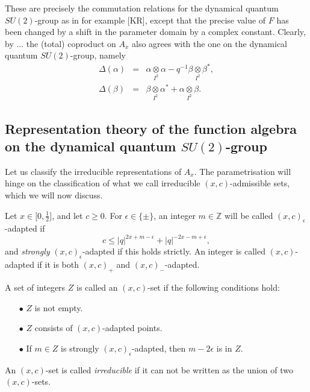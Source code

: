 \documentclass[12pt]{article}
\theoremstyle{change}
\newcommand{\Z}{\mathbb{Z}}
\newcommand{\itimes}{\underset{I^2}{\otimes}}
\theoremstyle{definition}
\numberwithin{equation}{section}
\begin{document}
These are precisely the commutation relations for the dynamical quantum $SU(2)$-group as in for example [KR], except that the precise value of $F$ has been changed by a shift in the parameter domain by a complex constant. Clearly, by ... the (total) coproduct on $A_x$ also  agrees with the one on the dynamical quantum $SU(2)$-group, namely \begin{eqnarray*} \Delta(\alpha) &=& \alpha\itimes \alpha - q^{-1}\beta\itimes \beta^*,\\ \Delta(\beta) &=& \beta\itimes \alpha^* +\alpha\itimes \beta.\end{eqnarray*}%

\subsection{Representation theory of the function algebra on the dynamical quantum $SU(2)$-group}


Let us classify the irreducible representations of $A_x$. The parametrisation will hinge on the classification of what we call irreducible $(x,c)$-admissible sets, which we will now discuss.

Let $x\in \lbrack 0,\frac{1}{2}\rbrack$, and let $c\geq 0$. For $\epsilon \in \{\pm\}$, an integer $m\in \Z$ will be called $(x,c)_{\epsilon}$-adapted if \begin{equation}\label{EqAd+}c \leq |q|^{2x+m-\epsilon}+|q|^{-2x-m+\epsilon},\end{equation} and \emph{strongly} $(x,c)_{\epsilon}$-adapted if this holds strictly. An integer is called $(x,c)$-adapted if it is both $(x,c)_+$ and $(x,c)_-$-adapted. 

A set of integers $Z$ is called an  $(x,c)$-set if the following conditions hold: \begin{itemize} 
\item[$\bullet$] $Z$ is not empty.
\item[$\bullet$] $Z$ consists of $(x,c)$-adapted points.
\item[$\bullet$] If $m\in Z$ is strongly $(x,c)_{\epsilon}$-adapted, then $m-2\epsilon$ is in $Z$.
\end{itemize}
An $(x,c)$-set is called \emph{irreducible} if it can not be written as the union of two $(x,c)$-sets.
\end{document}
